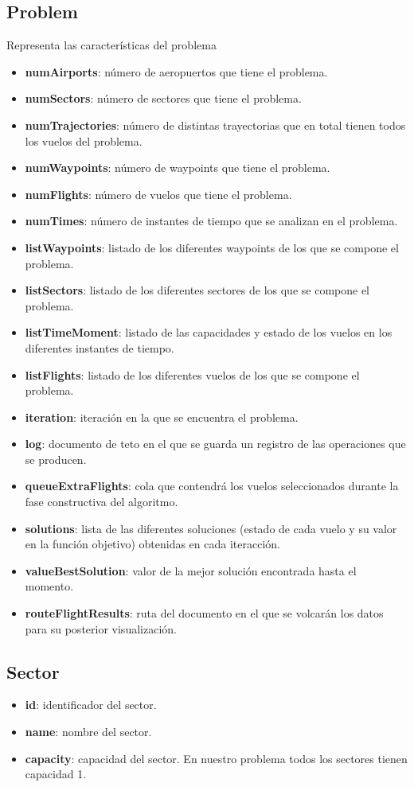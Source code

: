 \subsection*{Problem}
Representa las características del problema
\begin{itemize}
	\item \textbf{numAirports}: número de aeropuertos que tiene el problema.
	\item \textbf{numSectors}: número de sectores que tiene el problema.
	\item \textbf{numTrajectories}: número de distintas trayectorias que en total tienen todos los vuelos del problema.
	\item \textbf{numWaypoints}: número de waypoints que tiene el problema.
	\item \textbf{numFlights}: número de vuelos que tiene el problema.
	\item \textbf{numTimes}: número de instantes de tiempo que se analizan en el problema.
	\item \textbf{listWaypoints}: listado de los diferentes waypoints de los que se compone el problema.
	\item \textbf{listSectors}: listado de los diferentes sectores de los que se compone el problema.
	\item \textbf{listTimeMoment}: listado de las capacidades y estado de los vuelos en los diferentes instantes de tiempo.
	\item \textbf{listFlights}: listado de los diferentes vuelos de los que se compone el problema.
	\item \textbf{iteration}: iteración en la que se encuentra el problema.
	\item \textbf{log}: documento de teto en el que se guarda un registro de las operaciones que se producen.
	\item \textbf{queueExtraFlights}: cola que contendrá los vuelos seleccionados durante la fase constructiva del algoritmo.
	\item \textbf{solutions}: lista de las diferentes soluciones (estado de cada vuelo y su valor en la función objetivo) obtenidas en cada iteracción.
	\item \textbf{valueBestSolution}: valor de la mejor solución encontrada hasta el momento.
	\item \textbf{routeFlightResults}: ruta del documento en el que se volcarán los datos para su posterior visualización.
\end{itemize}

\subsection*{Sector}
\begin{itemize}
	\item \textbf{id}: identificador del sector.
	\item \textbf{name}: nombre del sector.
	\item \textbf{capacity}: capacidad del sector. En nuestro problema todos los sectores tienen capacidad 1.
\end{itemize}

